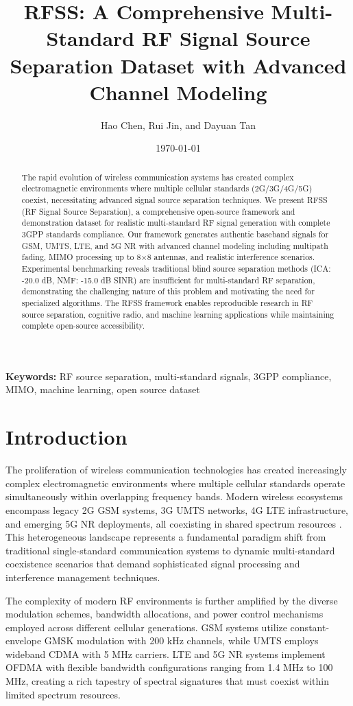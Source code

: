 \documentclass[twocolumn]{article}
\title{RFSS: A Comprehensive Multi-Standard RF Signal Source Separation Dataset with Advanced Channel Modeling}
\author{
Hao Chen, Rui Jin, and  Dayuan Tan
}
\date{\today}
\begin{document}
\maketitle

\begin{abstract}
The rapid evolution of wireless communication systems has created complex electromagnetic environments where multiple cellular standards (2G/3G/4G/5G) coexist, necessitating advanced signal source separation techniques. We present RFSS (RF Signal Source Separation), a comprehensive open-source framework and demonstration dataset for realistic multi-standard RF signal generation with complete 3GPP standards compliance. Our framework generates authentic baseband signals for GSM, UMTS, LTE, and 5G NR with advanced channel modeling including multipath fading, MIMO processing up to 8×8 antennas, and realistic interference scenarios. Experimental benchmarking reveals traditional blind source separation methods (ICA: -20.0 dB, NMF: -15.0 dB SINR) are insufficient for multi-standard RF separation, demonstrating the challenging nature of this problem and motivating the need for specialized algorithms. The RFSS framework enables reproducible research in RF source separation, cognitive radio, and machine learning applications while maintaining complete open-source accessibility.
\end{abstract}

\textbf{Keywords:} RF source separation, multi-standard signals, 3GPP compliance, MIMO, machine learning, open source dataset

\section{Introduction}

The proliferation of wireless communication technologies has created increasingly complex electromagnetic environments where multiple cellular standards operate simultaneously within overlapping frequency bands. Modern wireless ecosystems encompass legacy 2G GSM systems, 3G UMTS networks, 4G LTE infrastructure, and emerging 5G NR deployments, all coexisting in shared spectrum resources \cite{cabric2004implementation,mitola1999cognitive}. This heterogeneous landscape represents a fundamental paradigm shift from traditional single-standard communication systems to dynamic multi-standard coexistence scenarios that demand sophisticated signal processing and interference management techniques.

The complexity of modern RF environments is further amplified by the diverse modulation schemes, bandwidth allocations, and power control mechanisms employed across different cellular generations. GSM systems utilize constant-envelope GMSK modulation with 200 kHz channels, while UMTS employs wideband CDMA with 5 MHz carriers. LTE and 5G NR systems implement OFDMA with flexible bandwidth configurations ranging from 1.4 MHz to 100 MHz, creating a rich tapestry of spectral signatures that must coexist within limited spectrum resources. 
\end{document}
